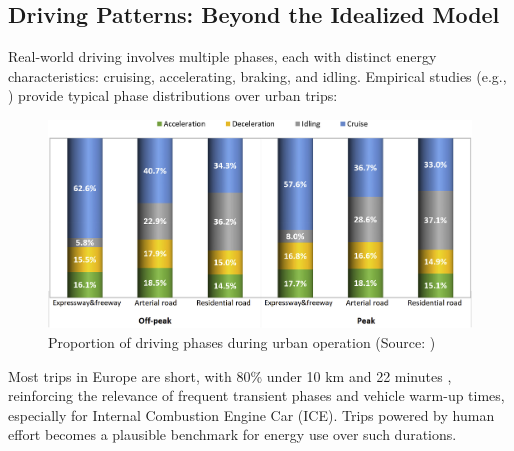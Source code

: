 \subsection{Driving Patterns: Beyond the Idealized Model}

Real-world driving involves multiple phases, each with distinct energy characteristics: cruising, accelerating, braking, and idling. Empirical studies (e.g., \cite{ma_real-world_2019}) provide typical phase distributions over urban trips:

\begin{figure}[h!]
    \centering
    \includegraphics[width=0.7\linewidth]{Figures/ch2_shareOfDrivingModeChina.jpg}
    \caption{Proportion of driving phases during urban operation (Source: \cite{ma_real-world_2019})}
    \label{fig:ch2proportiondrivingmode}
\end{figure}

\newpage 

Most trips in Europe are short, with 80\% under 10 km and 22 minutes \cite{donati_individual_2015}, reinforcing the relevance of frequent transient phases and vehicle warm-up times, especially for Internal Combustion Engine Car (ICE). Trips powered by human effort becomes a plausible benchmark for energy use over such durations.


